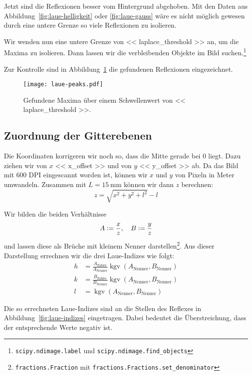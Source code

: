 Jetzt sind die Reflexionen besser vom Hintergrund abgehoben. Mit den Daten aus
Abbildung~\ref{fig:laue-helligkeit} oder \ref{fig:laue-gauss} wäre es nicht
möglich gewesen durch eine untere Grenze so viele Reflexionen zu isolieren.

Wir wenden nun eine untere Grenze von \num{<< laplace_threshold >>} an, um die
Maxima zu isolieren. Dann lassen wir die verbleibenden Objekte im Bild
suchen.\footnote{\texttt{scipy.ndimage.label} und
\texttt{scipy.ndimage.find\_objects}}

Zur Kontrolle sind in Abbildung~\ref{fig:laue-peaks} die gefundenen Reflexionen
eingezeichnet.

\begin{figure}[htbp]
    \centering
    \texttt{[image: laue-peaks.pdf]}
    \caption{%
        Gefundene Maxima über einem Schwellenwert von \num{<< laplace_threshold
        >>}.
    }
    \label{fig:laue-peaks}
\end{figure}

\subsection{Zuordnung der Gitterebenen}

Die Koordinaten korrigeren wir noch so, dass die Mitte gerade bei 0 liegt. Dazu
ziehen wir von $x$ \num{<< x_offset >>} und von $y$ \num{<< y_offset >>} ab. Da
das Bild mit 600 DPI eingescannt worden ist, können wir $x$ und $y$ von Pixeln
in Meter umwandeln. Zusammen mit $L = \SI{15}{\milli\meter}$ können wir dann
$z$ berechnen:
\[
    z = \sqrt{x^2 + y^2 + l^2} - l
\]

Wir bilden die beiden Verhältnisse
\[
    A := \frac xz
    ,\quad
    B := \frac yz
\]
und lassen diese als Brüche mit kleinem Nenner
darstellen\footnote{\texttt{fractions.Fraction} mit
\texttt{fractions.Fractions.set\_denominator}}. Aus dieser Darstellung
errechnen wir die drei Laue-Indizes wie folgt:
\begin{align*}
    h &= \frac{A_\text{Zähler}}{A_\text{Nenner}}
    \mathop{\mathrm{kgv}}(A_\text{Nenner}, B_\text{Nenner}) \\
    k &= \frac{B_\text{Zähler}}{B_\text{Nenner}}
    \mathop{\mathrm{kgv}}(A_\text{Nenner}, B_\text{Nenner}) \\
    l &= \mathop{\mathrm{kgv}}(A_\text{Nenner}, B_\text{Nenner})
\end{align*}

Die so errechneten Laue-Indizes sind an die Stellen des Reflexes in
Abbildung~\ref{fig:laue-indizes} eingetragen. Dabei bedeutet die
Überstreichung, dass der entsprechende Werte negativ ist.

